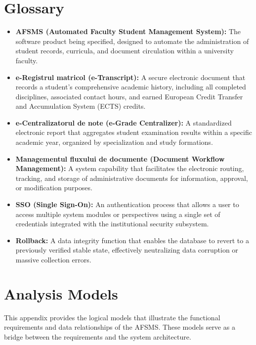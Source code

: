\documentclass[11pt, a4paper]{article}
\begin{document}
\section{Glossary}
\begin{itemize}
    \item \textbf{AFSMS (Automated Faculty Student Management System):} The software product being specified, designed to automate the administration of student records, curricula, and document circulation within a university faculty.
    \item \textbf{e-Registrul matricol (e-Transcript):} A secure electronic document that records a student's comprehensive academic history, including all completed disciplines, associated contact hours, and earned European Credit Transfer and Accumulation System (ECTS) credits.
    \item \textbf{e-Centralizatorul de note (e-Grade Centralizer):} A standardized electronic report that aggregates student examination results within a specific academic year, organized by specialization and study formations.
    \item \textbf{Managementul fluxului de documente (Document Workflow Management):} A system capability that facilitates the electronic routing, tracking, and storage of administrative documents for information, approval, or modification purposes.
    \item \textbf{SSO (Single Sign-On):} An authentication process that allows a user to access multiple system modules or perspectives using a single set of credentials integrated with the institutional security subsystem.
    \item \textbf{Rollback:} A data integrity function that enables the database to revert to a previously verified stable state, effectively neutralizing data corruption or massive collection errors.
\end{itemize}

\section{Analysis Models}
This appendix provides the logical models that illustrate the functional requirements and data relationships of the AFSMS. These models serve as a bridge between the requirements and the system architecture.
\end{document}
